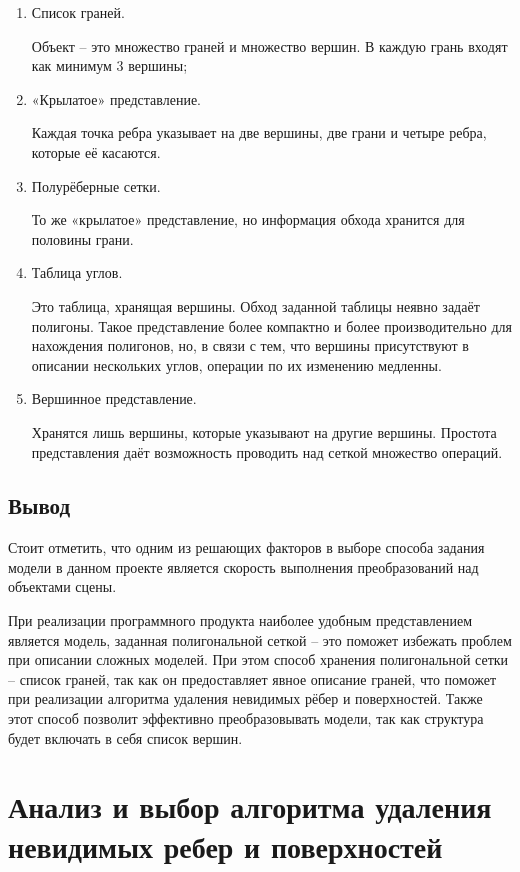 \begin{enumerate}

\item Список граней. 

Объект – это множество граней и множество вершин. В каждую грань входят как минимум 3 вершины;
\item«Крылатое» представление. 

Каждая точка ребра указывает на две вершины, две грани и четыре ребра, которые её касаются.

\item Полурёберные сетки.

 То же «крылатое» представление, но информация обхода хранится для половины грани.
 
\item Таблица углов.

 Это таблица, хранящая вершины. Обход заданной таблицы неявно задаёт полигоны. Такое представление более компактно и более производительно для нахождения полигонов, но, в связи с тем, что вершины присутствуют в описании нескольких углов, операции по их изменению медленны.
 
\item Вершинное представление.

 Хранятся лишь вершины, которые указывают на другие вершины. Простота представления даёт возможность проводить над сеткой множество операций.

\end{enumerate}

\subsection{Вывод}
Стоит отметить, что одним из решающих факторов в выборе способа задания модели в данном проекте является скорость выполнения преобразований над объектами сцены.

При реализации программного продукта наиболее удобным представлением является модель, заданная полигональной сеткой – это поможет избежать проблем при описании сложных моделей. При этом способ хранения полигональной сетки – список граней, так как он предоставляет явное описание граней, что поможет при реализации алгоритма удаления невидимых рёбер и поверхностей. Также этот способ позволит эффективно преобразовывать модели, так как структура будет включать в себя список вершин. 




\section{Анализ и выбор алгоритма удаления невидимых ребер и поверхностей}

